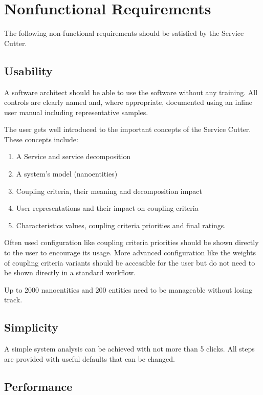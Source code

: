 \section{Nonfunctional Requirements}
\label{sec:nonfunctionalRequirements}

The following non-functional requirements should be satisfied by the Service Cutter.

\subsection{Usability}
\label{sec:usability}

A software architect should be able to use the software without any training. All controls are clearly named and, where appropriate, documented using an inline user manual including representative samples.

The user gets well introduced to the important concepts of the Service Cutter. These concepts include:

\begin{enumerate}
	\item A Service and service decomposition
	\item A system's model (nanoentities)
	\item Coupling criteria, their meaning and decomposition impact
	\item User representations and their impact on coupling criteria
	\item Characteristics values, coupling criteria priorities and final ratings.
\end{enumerate}

Often used configuration like coupling criteria priorities should be shown directly to the user to encourage its usage. More advanced configuration like the weights of coupling criteria variants should be accessible for the user but do not need to be shown directly in a standard workflow. 

Up to 2000 nanoentities and 200 entities need to be manageable without losing track.

\subsection{Simplicity}

A simple system analysis can be achieved with not more than 5 clicks. All steps are provided with useful defaults that can be changed.

\subsection{Performance}

